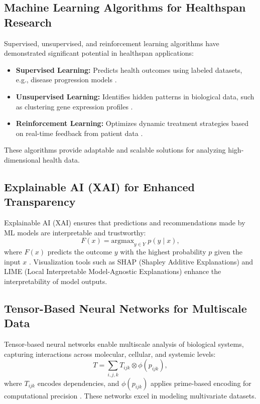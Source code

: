 \documentclass{article}
\theoremstyle{plain}
\begin{document}
\subsection{Machine Learning Algorithms for Healthspan Research}
Supervised, unsupervised, and reinforcement learning algorithms have demonstrated significant potential in healthspan applications:
\begin{itemize}
    \item \textbf{Supervised Learning:} Predicts health outcomes using labeled datasets, e.g., disease progression models \cite{supervisedLearning2023}.
    \item \textbf{Unsupervised Learning:} Identifies hidden patterns in biological data, such as clustering gene expression profiles \cite{unsupervisedLearning2022}.
    \item \textbf{Reinforcement Learning:} Optimizes dynamic treatment strategies based on real-time feedback from patient data \cite{reinforcementLearning2023}.
\end{itemize}
These algorithms provide adaptable and scalable solutions for analyzing high-dimensional health data.

\subsection{Explainable AI (XAI) for Enhanced Transparency}
Explainable AI (XAI) ensures that predictions and recommendations made by ML models are interpretable and trustworthy:
\begin{equation}
F(x) = \text{argmax}_{y \in Y} \; p(y \mid x),
\end{equation}
where $F(x)$ predicts the outcome $y$ with the highest probability $p$ given the input $x$ \cite{xai2023}. Visualization tools such as SHAP (Shapley Additive Explanations) and LIME (Local Interpretable Model-Agnostic Explanations) enhance the interpretability of model outputs.

\subsection{Tensor-Based Neural Networks for Multiscale Data}
Tensor-based neural networks enable multiscale analysis of biological systems, capturing interactions across molecular, cellular, and systemic levels:
\begin{equation}
T = \sum_{i,j,k} T_{ijk} \otimes \phi(p_{ijk}),
\end{equation}
where $T_{ijk}$ encodes dependencies, and $\phi(p_{ijk})$ applies prime-based encoding for computational precision \cite{tensorNetworks2022}. These networks excel in modeling multivariate datasets.
\end{document}
